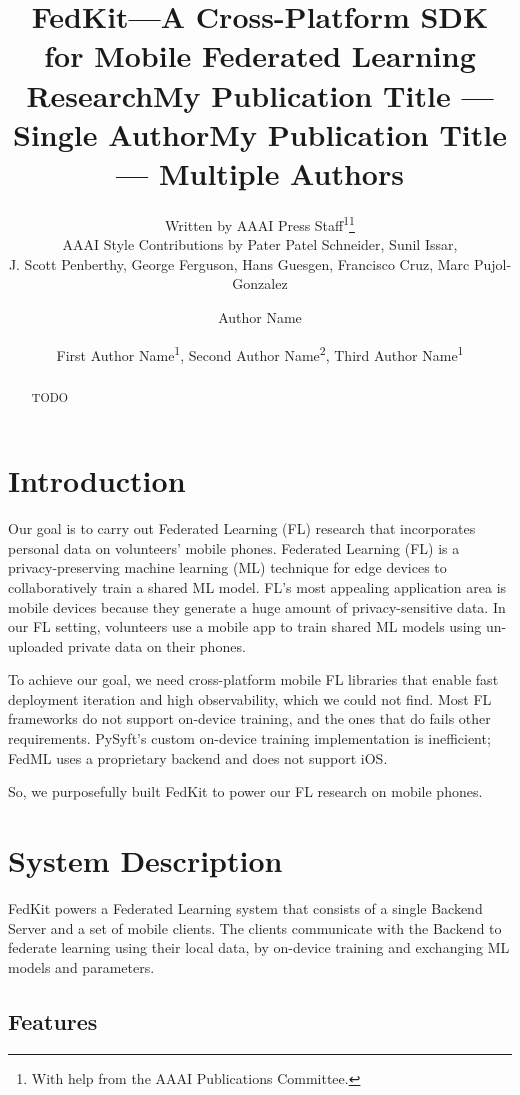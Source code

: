 \documentclass[letterpaper]{article} %
\title{FedKit---A Cross-Platform SDK for Mobile Federated Learning Research}
\author{
    Written by AAAI Press Staff\textsuperscript{\rm 1}\thanks{With help from the AAAI Publications Committee.}\\
    AAAI Style Contributions by Pater Patel Schneider,
    Sunil Issar,\\
    J. Scott Penberthy,
    George Ferguson,
    Hans Guesgen,
    Francisco Cruz\equalcontrib,
    Marc Pujol-Gonzalez\equalcontrib
}
\title{My Publication Title --- Single Author}
\author {
    Author Name
}
\title{My Publication Title --- Multiple Authors}
\author {
    First Author Name\textsuperscript{\rm 1},
    Second Author Name\textsuperscript{\rm 2},
    Third Author Name\textsuperscript{\rm 1}
}
\begin{document}
\maketitle

\begin{abstract}
    TODO
\end{abstract}

\section{Introduction}

Our goal is to carry out Federated Learning (FL) research that incorporates
personal data on volunteers' mobile phones.
Federated Learning (FL) is a privacy-preserving machine learning (ML) technique
for edge devices to collaboratively train a shared ML model.
FL's most appealing application area is mobile devices because
they generate a huge amount of privacy-sensitive data.
In our FL setting,
volunteers use a mobile app to train shared ML models
using un-uploaded private data on their phones.

To achieve our goal, we need cross-platform mobile FL libraries that
enable fast deployment iteration and high observability,
which we could not find.
Most FL frameworks do not support on-device training,
and the ones that do fails other requirements. %
PySyft's \cite{ryffel2018generic,Ziller2021,hall2021syft}
custom on-device training implementation is inefficient;
FedML \cite{he2020fedml} uses a proprietary backend and does not support iOS.

So, we purposefully built FedKit to power our FL research on mobile phones.

\section{System Description}

\newcommand{\model}{$M$}
\newcommand{\fs}{$S_\mathrm F$}

FedKit powers a Federated Learning system that
consists of a single Backend Server and a set of mobile clients.
The clients communicate with the Backend to federate learning
using their local data,
by on-device training and exchanging ML models and parameters.

\subsection{Features}
\end{document}
